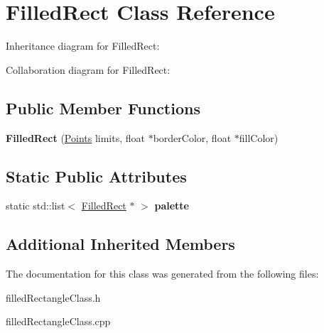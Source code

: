 \hypertarget{classFilledRect}{}\section{Filled\+Rect Class Reference}
\label{classFilledRect}


Inheritance diagram for Filled\+Rect\+:


Collaboration diagram for Filled\+Rect\+:
\subsection*{Public Member Functions}
\begin{DoxyCompactItemize}
\item 
{\bfseries Filled\+Rect} (\hyperlink{structPoints}{Points} limits, float $\ast$border\+Color, float $\ast$fill\+Color)\hypertarget{classFilledRect_ad37be948875a170d20f7dade1395a7b8}{}\label{classFilledRect_ad37be948875a170d20f7dade1395a7b8}

\end{DoxyCompactItemize}
\subsection*{Static Public Attributes}
\begin{DoxyCompactItemize}
\item 
static std\+::list$<$ \hyperlink{classFilledRect}{Filled\+Rect} $\ast$ $>$ {\bfseries palette}\hypertarget{classFilledRect_aec22403385ae119b34e8758667d89727}{}\label{classFilledRect_aec22403385ae119b34e8758667d89727}

\end{DoxyCompactItemize}
\subsection*{Additional Inherited Members}


The documentation for this class was generated from the following files\+:\begin{DoxyCompactItemize}
\item 
filled\+Rectangle\+Class.\+h\item 
filled\+Rectangle\+Class.\+cpp\end{DoxyCompactItemize}
